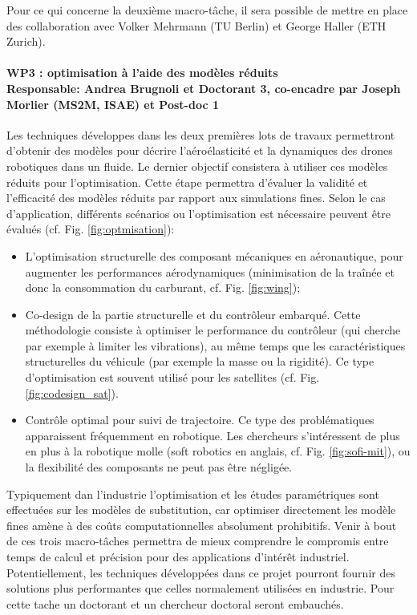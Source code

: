 \documentclass[12pt, french]{article}
\begin{document}
Pour ce qui concerne la deuxième macro-tâche, il sera possible de mettre en place des collaboration avec Volker Mehrmann (TU Berlin) et George Haller (ETH Zurich).


\paragraph{\large WP3 : optimisation à l'aide des modèles réduits\\
	Responsable: Andrea Brugnoli et Doctorant 3, co-encadre par Joseph Morlier (MS2M, ISAE) et Post-doc 1\\}

Les techniques développes dans les deux premières lots de travaux permettront d'obtenir des modèles pour décrire l'aéroélasticité et la dynamiques des drones robotiques dans un fluide.
Le dernier objectif consistera à utiliser ces modèles réduits pour l'optimisation. Cette étape permettra d’évaluer la validité et l’efficacité des modèles réduits par rapport aux simulations fines. Selon le cas d'application, différents scénarios ou l'optimisation est nécessaire peuvent être évalués (cf. Fig. \ref{fig:optmisation}): 
\begin{itemize}
	\item L'optimisation structurelle des composant mécaniques en aéronautique, pour augmenter les performances aérodynamiques (minimisation de la traînée et donc la consommation du carburant, cf. Fig. \ref{fig:wing}); 
	\item Co-design de la partie structurelle et du contrôleur embarqué. Cette méthodologie consiste à optimiser le performance du contrôleur (qui cherche par exemple à limiter les vibrations), au même temps que les caractéristiques structurelles du véhicule (par exemple la masse ou la rigidité). Ce type d'optimisation est souvent utilisé pour les satellites (cf. Fig. \ref{fig:codesign_sat}).
	\item Contrôle optimal pour suivi de trajectoire. Ce type des problématiques apparaissent fréquemment en robotique. Les chercheurs s'intéressent de plus en plus à la robotique molle (soft robotics en anglais, cf. Fig. \ref{fig:sofi-mit}), ou la flexibilité des composants ne peut pas être négligée.
\end{itemize}

Typiquement dan l'industrie l'optimisation et les études paramétriques sont effectuées sur les
modèles de substitution, car optimiser directement les modèle fines amène à des coûts computationnelles absolument prohibitifs. Venir à bout de ces trois macro-tâches
permettra de mieux comprendre le compromis entre temps de calcul et précision pour des
applications d’intérêt industriel. Potentiellement, les techniques développées dans ce projet pourront fournir des solutions plus performantes que celles normalement utilisées en industrie. Pour cette tache un doctorant et un chercheur doctoral seront embauchés. 
\end{document}
